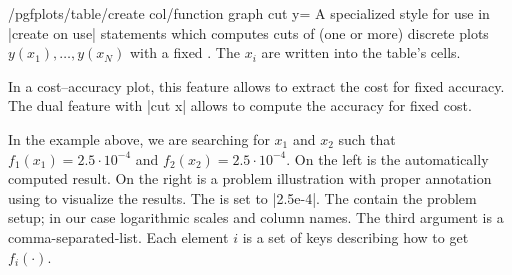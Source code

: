 \begin{stylekey}{/pgfplots/table/create col/function graph cut y=}
    A specialized style for use in |create on use| statements which computes
    cuts of (one or more) discrete plots $y(x_1), \dotsc, y(x_N)$ with a fixed
    . The $x_i$ are written into the table's cells.

    In a cost--accuracy plot, this feature allows to extract the cost for fixed
    accuracy. The dual feature with |cut x| allows to compute the accuracy for
    fixed cost.
    \pgfplotsset{anchor=center,/tikz/baseline}
\begin{codeexample}[pre={\begin{lateximage}},post={\end{lateximage}}]
    \loadedtable

\pgfplotstabletypeset{\loadedtable}

\end{codeexample}
    In the example above, we are searching for $x_1$ and $x_2$ such that
    $f_1(x_1) = 2.5\cdot 10^{-4}$ and $f_2(x_2)
    =2.5\cdot 10^{-4}$. On the left is the automatically computed
    result. On the right is a problem illustration with proper annotation using
    \PGFPlots{} to visualize the results. The  is set to
    |2.5e-4|. The  contain the problem setup; in our case
    logarithmic scales and column names. The third argument is a
    comma-separated-list. Each element $i$ is a set of keys describing how to
    get $f_i(\cdot)$.


\end{stylekey}
